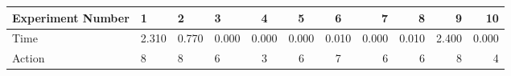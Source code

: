 \documentclass[8pt]{article}
\begin{document}
\begin{landscape}
\begin{tabular}{ | l | l | l | l | c | c | c | r | r | r | r | }
 \hline 
Experiment Number & 1 & 2 & 3 & 4 & 5 & 6 & 7 & 8 & 9 & 10\\ \hline
Time & 2.310 & 0.770 & 0.000 & 0.000 & 0.000 & 0.010 & 0.000 & 0.010 & 2.400 & 0.000\\ \hline
Action & 8 & 8 & 6 & 3 & 6 & 7 & 6 & 6 & 8 & 4\\ \hline\end{tabular}
\end{landscape}
\end{document}
